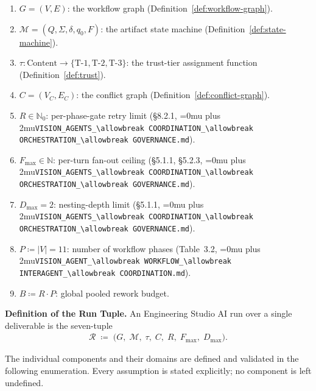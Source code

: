 \documentclass[12pt]{article}
\theoremstyle{definition}
\DeclareRobustCommand{\code}[1]{\begingroup\Urlmuskip=0mu plus 2mu\relax\nolinkurl{#1}\endgroup}
\newcommand{\VisionGov}{\code{VISION\_AGENTS\_\allowbreak COORDINATION\_\allowbreak ORCHESTRATION\_\allowbreak GOVERNANCE.md}}
\newcommand{\VisionFlow}{\code{VISION\_AGENT\_\allowbreak WORKFLOW\_\allowbreak INTERAGENT\_\allowbreak COORDINATION.md}}
\begin{document}
\begin{enumerate}
  \item $G = (V, E)$: the workflow graph
        (Definition~\ref{def:workflow-graph}).
  \item $\mathcal{M} = (Q, \Sigma, \delta, q_0, F)$: the artifact
        state machine (Definition~\ref{def:state-machine}).
  \item $\tau : \mathrm{Content} \to
        \{\mathrm{T\text{-}1},\mathrm{T\text{-}2},\mathrm{T\text{-}3}\}$:
        the trust-tier assignment function
        (Definition~\ref{def:trust}).
  \item $C = (V_C, E_C)$: the conflict graph
        (Definition~\ref{def:conflict-graph}).
  \item $R \in \mathbb{N}_0$: per-phase-gate retry limit
        (\S8.2.1, \VisionGov{}).
  \item $F_{\max} \in \mathbb{N}$: per-turn fan-out ceiling
        (\S5.1.1, \S5.2.3, \VisionGov{}).
  \item $D_{\max} = 2$: nesting-depth limit
        (\S5.1.1, \VisionGov{}).
  \item $P \coloneqq |V| = 11$: number of workflow phases
        (Table~3.2, \VisionFlow{}).
  \item $B \coloneqq R \cdot P$: global pooled rework budget.
\end{enumerate}

\medskip
\noindent\textbf{Definition of the Run Tuple.}
An Engineering Studio AI run over a single deliverable is the
seven-tuple
\begin{align}
  \label{eq:run-tuple}
  \mathcal{R}
  \;\coloneqq\;
  \bigl(
    G,\;
    \mathcal{M},\;
    \tau,\;
    C,\;
    R,\;
    F_{\max},\;
    D_{\max}
  \bigr).
\end{align}

\noindent The individual components and their domains are defined
and validated in the following enumeration.  Every assumption is
stated explicitly; no component is left undefined.
\end{document}
